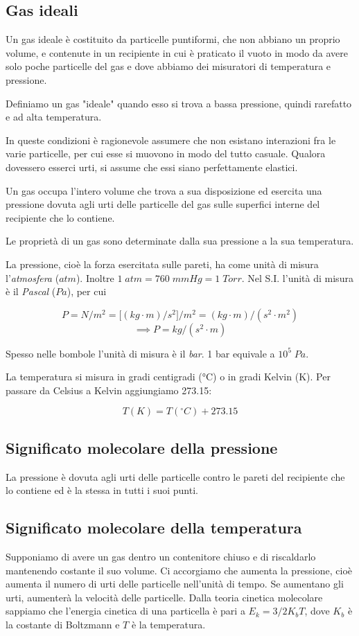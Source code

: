 \subsection{Gas ideali}
Un gas ideale è costituito da particelle puntiformi, che non abbiano un proprio volume, e contenute in un recipiente in cui è praticato il vuoto in modo da avere solo poche particelle del gas e dove abbiamo dei misuratori di temperatura e pressione.

Definiamo un gas "ideale" quando esso si trova a bassa pressione, quindi rarefatto e ad alta temperatura.

In queste condizioni è ragionevole assumere che non esistano interazioni fra le varie particelle, per cui esse si muovono in modo del tutto casuale. Qualora dovessero esserci urti, si assume che essi siano perfettamente elastici.

Un gas occupa l'intero volume che trova a sua disposizione ed esercita una pressione dovuta agli urti delle particelle del gas sulle superfici interne del recipiente che lo contiene.

Le proprietà di un gas sono determinate dalla sua pressione a la sua temperatura.

\vspace{0.2cm}La pressione, cioè la forza esercitata sulle pareti, ha come unità di misura l'\textit{atmosfera} ($atm$). Inoltre $1 \; atm=760 \; mmHg=1 \; Torr$. Nel S.I. l'unità di misura è il \textit{Pascal} ($Pa$), per cui

$$P=N/m^2=\big[ (kg \cdot m)/s^2 \big]/m^2=(kg \cdot m)/(s^2 \cdot m^2)$$
$$\implies P=kg/(s^2 \cdot m)$$

Spesso nelle bombole l'unità di misura è il \textit{bar}. 1 bar equivale a $10^5 \; Pa$.

La temperatura si misura in gradi centigradi (°C) o in gradi Kelvin (K). Per passare da Celsius a Kelvin aggiungiamo 273.15:

$$T(K)=T(^{\circ}C) + 273.15$$
\subsection{Significato molecolare della pressione}
La pressione è dovuta agli urti delle particelle contro le pareti del recipiente che lo contiene ed è la stessa in tutti i suoi punti.
\subsection{Significato molecolare della temperatura}
Supponiamo di avere un gas dentro un contenitore chiuso e di riscaldarlo mantenendo costante il suo volume. Ci accorgiamo che aumenta la pressione, cioè aumenta il numero di urti delle particelle nell'unità di tempo. Se aumentano gli urti, aumenterà la velocità delle particelle. Dalla teoria cinetica molecolare sappiamo che l'energia cinetica di una particella è pari a $E_k=3/2 K_bT$, dove $K_b$ è la costante di Boltzmann e $T$ è la temperatura.

